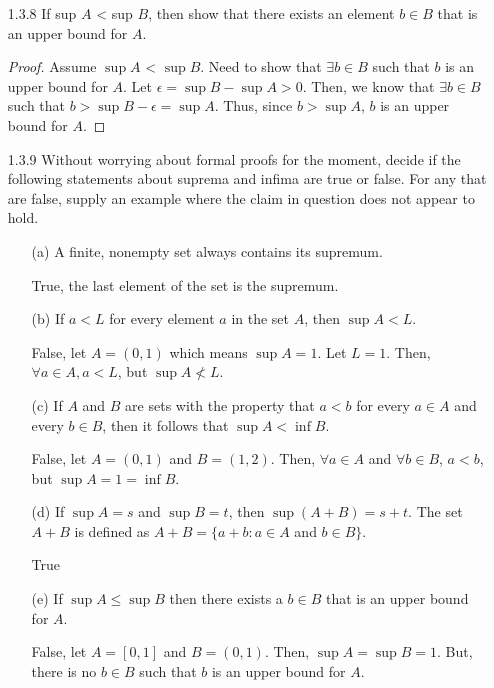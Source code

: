 \documentclass[12pt,letterpaper]{article}
\begin{document}
\begin{itemize}[leftmargin=!,labelindent=5pt]
\begin{itemize}
\begin{proof}
                ($\Leftarrow$) 
                Assume $s$ is a lower bound for $A$ such that $\forall \epsilon > 0$, $s + \epsilon$ is not a lower bound for $A$.
                So, for all lower bounds $l$, $l \leq s$. 
                This satisfies both parts of the definition of $s = \inf A$, that is $s$ is a lower bound and for all lower bounds $l$, $l \leq s$.
            \end{proof}
        \end{itemize}
    \item[1.3.8] If sup $A$ < sup $B$, then show that there exists an element $b \in B$ that is an upper bound for $A$.
    \begin{proof}
        Assume $\sup A$ < $\sup B$. 
        Need to show that $\exists b \in B$ such that $b$ is an upper bound for $A$.
        Let $\epsilon = \sup B - \sup A > 0$.
        Then, we know that $\exists b \in B$ such that $b > \sup B - \epsilon = \sup A$.
        Thus, since $b > \sup A$, $b$ is an upper bound for $A$.
    \end{proof}
    \item[1.3.9] Without worrying about formal proofs for the moment, decide if the following statements about suprema and infima are true or false. For any that are false, supply an example where the claim in question does not appear to hold.
        \begin{itemize}
            \item [(a)] A finite, nonempty set always contains its supremum.
            
                True, the last element of the set is the supremum.
            \item [(b)] If $a < L$ for every element $a$ in the set $A$, then $\sup A < L$.
            
                False, let $A = (0, 1)$ which means $\sup A = 1$. Let $L = 1$. Then, $\forall a \in A, a < L$, but $\sup A \not < L$.
            \item [(c)] If $A$ and $B$ are sets with the property that $a < b$ for every $a \in A$ and every $b \in B$, then it follows that $\sup A < \inf B$.
            
                False, let $A = (0, 1)$ and $B = (1, 2)$. Then, $\forall a \in A$ and $\forall b \in B$, $a < b$, but $\sup A = 1 = \inf B$.
            \item [(d)] If $\sup A = s$ and $\sup B = t$, then $\sup (A+B) = s+t$. The set $A+B$ is defined as $A + B = \{a + b : a \in A$ and $b \in B\}$.
            
                True
            \item [(e)] If $\sup A \leq \sup B$ then there exists a $b\in B$ that is an upper bound for $A$.
            
            False, let $A = [0, 1]$ and $B = (0, 1)$. Then, $\sup A = \sup B = 1$.
            But, there is no $b \in B$ such that $b$ is an upper bound for $A$.
        \end{itemize}
\end{itemize}
\end{document}

